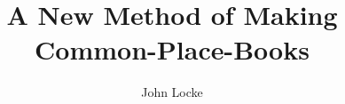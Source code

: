 \documentclass[17pt, a6paper, oneside]{book}
\title{A New Method of Making Common-Place-Books}
\author{John Locke}
\begin{document}
\sloppy

\end{document}

